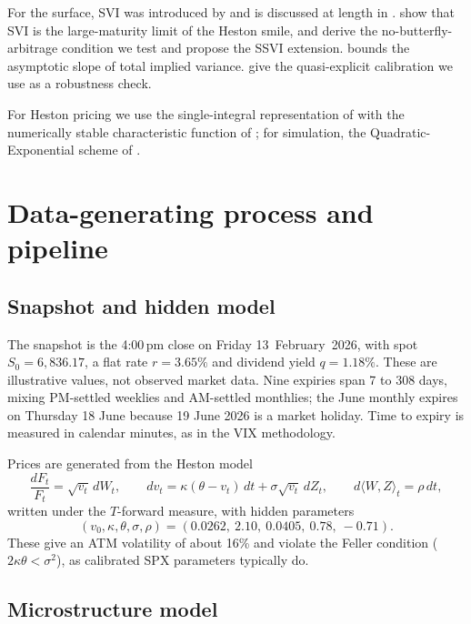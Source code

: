\documentclass[11pt]{article}
\theoremstyle{remark}
\begin{document}
For the surface, SVI was introduced by \citet{gatheral2004} and is discussed at length in \citet{gatheral2006}.
\citet{gatheraljacquier2011} show that SVI is the large-maturity limit of the Heston smile, and \citet{gatheraljacquier2014} derive the no-butterfly-arbitrage condition we test and propose the SSVI extension.
\citet{lee2004} bounds the asymptotic slope of total implied variance.
\citet{demarcomartini2009} give the quasi-explicit calibration we use as a robustness check.

For Heston pricing we use the single-integral representation of \citet{lewis2000} with the numerically stable characteristic function of \citet{albrecher2007}; for simulation, the Quadratic-Exponential scheme of \citet{andersen2008}.

\section{Data-generating process and pipeline}
\label{sec:method}

\subsection{Snapshot and hidden model}

The snapshot is the 4:00\,pm close on Friday 13~February~2026, with spot $S_0 = 6{,}836.17$, a flat rate $r = 3.65\%$ and dividend yield $q = 1.18\%$.
These are illustrative values, not observed market data.
Nine expiries span 7 to 308 days, mixing PM-settled weeklies and AM-settled monthlies; the June monthly expires on Thursday 18 June because 19 June 2026 is a market holiday.
Time to expiry is measured in calendar minutes, as in the VIX methodology.

Prices are generated from the Heston model
\begin{equation}
  \frac{dF_t}{F_t} = \sqrt{v_t}\, dW_t, \qquad
  dv_t = \kappa(\theta - v_t)\,dt + \sigma\sqrt{v_t}\, dZ_t, \qquad
  d\langle W, Z\rangle_t = \rho\, dt,
\end{equation}
written under the $T$-forward measure, with hidden parameters
\[
  (v_0, \kappa, \theta, \sigma, \rho) = (0.0262,\ 2.10,\ 0.0405,\ 0.78,\ -0.71).
\]
These give an ATM volatility of about 16\% and violate the Feller condition ($2\kappa\theta < \sigma^2$), as calibrated SPX parameters typically do.

\subsection{Microstructure model}
\end{document}
